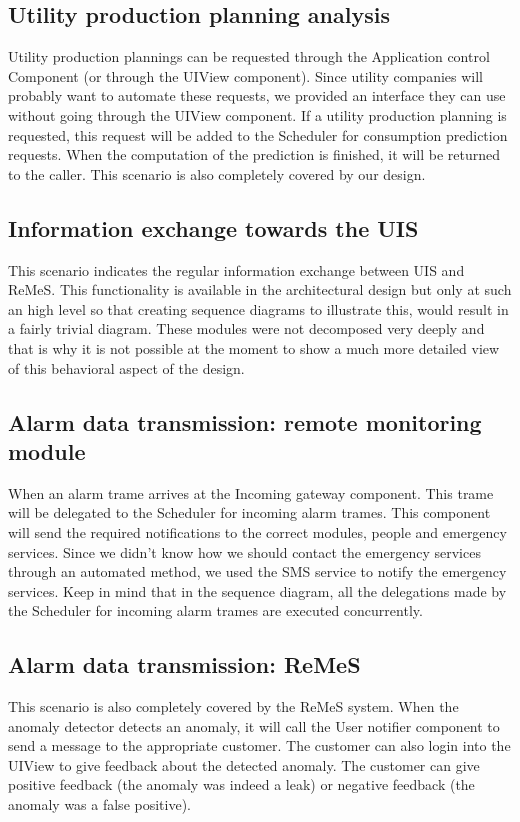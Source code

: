 \subsection{Utility production planning analysis}
Utility production plannings can be requested through the Application control Component (or through the UIView component). Since utility
companies will probably want to automate these requests, we provided an interface they can use without going through the UIView component.
If a utility production planning is requested, this request will be added to the Scheduler for consumption prediction requests. When the
computation of the prediction is finished, it will be returned to the caller. This scenario is also completely covered by our design.
\subsection{Information exchange towards the UIS}
This scenario indicates the regular information exchange between UIS and ReMeS. This functionality is available in the architectural design but only at such an high level so that creating sequence diagrams to illustrate this, would result in a fairly trivial diagram. These modules were not decomposed very deeply and that is why it is not possible at the moment to show a much more detailed view of this behavioral aspect of the design.
\subsection{Alarm data transmission: remote monitoring module}
When an alarm trame arrives at the Incoming gateway component. This trame will be delegated to the Scheduler for incoming alarm trames. This
component will send the required notifications to the correct modules, people and emergency services. Since we didn't know how we should contact
the emergency services through an automated method, we used the SMS service to notify the emergency services. Keep in mind that in the sequence
diagram, all the delegations made by the Scheduler for incoming alarm trames are executed concurrently.
\subsection{Alarm data transmission: ReMeS}
This scenario is also completely covered by the ReMeS system. When the anomaly detector detects an anomaly, it will call the User notifier component
to send a message to the appropriate customer. The customer can also login into the UIView to give feedback about the detected anomaly. The customer
can give positive feedback (the anomaly was indeed a leak) or negative feedback (the anomaly was a false positive).
